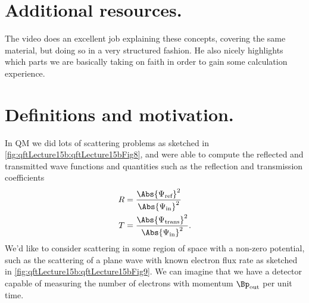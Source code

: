 %
%
\section{Additional resources.}

The video \citep{tobiasQFTL12Smatrix} does an excellent job explaining these concepts, covering the same material, but doing so in a very structured fashion.  He also nicely highlights which parts we are basically taking on faith in order to gain some calculation experience.

\section{Definitions and motivation.}
In QM we did lots of scattering problems as sketched in \cref{fig:qftLecture15b:qftLecture15bFig8},
and were able to compute the reflected and transmitted wave functions and quantities such as the reflection and transmission coefficients
\begin{equation}\label{eqn:qftLecture15b:440}
\begin{aligned}
R &= \frac
{\Abs{ \Psi_{\text{ref}}}^2}
{\Abs{ \Psi_{\text{in}}}^2} \\
T &= \frac
{\Abs{ \Psi_{\text{trans}}}^2}
{\Abs{ \Psi_{\text{in}}}^2}.
\end{aligned}
\end{equation}
We'd like to consider scattering in some region of space with a non-zero potential, such as the scattering of a plane wave with known electron flux rate as sketched in
\cref{fig:qftLecture15b:qftLecture15bFig9}.
We can imagine that we have a detector capable of measuring the number of electrons with momentum \( \Bp_{\text{out}} \) per unit time.


